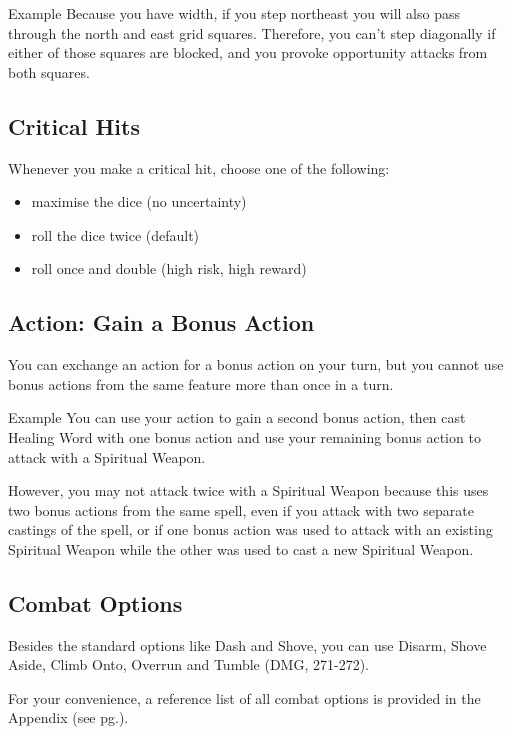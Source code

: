\documentclass[letterpaper,twocolumn,openany,nodeprecatedcode]{dndbook}
\newcommand{\pg}[1]{pg.\pageref{#1}}
\newcommand{\see}[1]{(see \pg{#1})}
\begin{document}
\begin{DndComment}{Example}
Because you have width, if you step northeast you will also pass through the north and east grid squares. Therefore, you can't step diagonally if either of those squares are blocked, and you provoke opportunity attacks from both squares.
\end{DndComment}

\subsection{Critical Hits}
Whenever you make a critical hit, choose one of the following:
\begin{itemize}
\item maximise the dice (no uncertainty)
\item roll the dice twice (default)
\item roll once and double (high risk, high reward)
\end{itemize}

\label{gameplay-bonus-action}
\subsection{Action: Gain a Bonus Action}
You can exchange an action for a bonus action on your turn, but you cannot use bonus actions from the same feature more than once in a turn.

\begin{DndComment}{Example}
You can use your action to gain a second bonus action, then cast Healing Word with one bonus action and use your remaining bonus action to attack with a Spiritual Weapon. 

However, you may not attack twice with a Spiritual Weapon because this uses two bonus actions from the same spell, even if you attack with two separate castings of the spell, or if one bonus action was used to attack with an existing Spiritual Weapon while the other was used to cast a new Spiritual Weapon.
\end{DndComment}

\subsection{Combat Options}
Besides the standard options like Dash and Shove, you can use Disarm, Shove Aside, Climb Onto, Overrun and Tumble (DMG, 271-272). 

For your convenience, a reference list of all combat options is provided in the Appendix \see{combat-options}.
\end{document}
